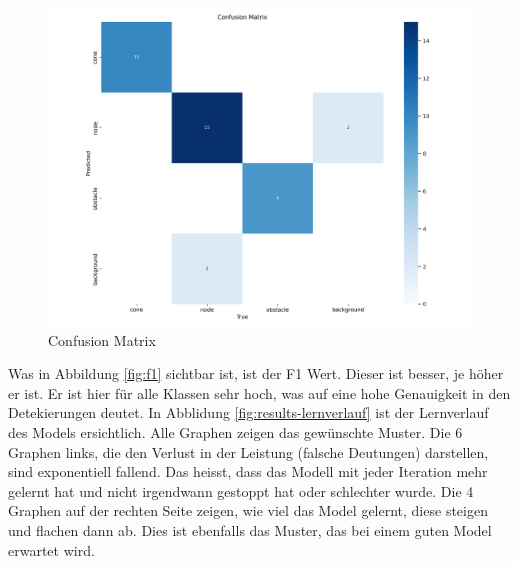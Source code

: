 \begin{figure}[H]
    \includegraphics[width=\textwidth]{assets/IT/yolo/confusion_matrix.png}
    \caption{Confusion Matrix}
    \label{fig:conf-matrix}
\end{figure}

Was in Abbildung \ref{fig:f1}  sichtbar ist, ist der F1 Wert. Dieser ist besser, je höher er ist. Er ist hier für alle Klassen sehr hoch, was auf eine hohe Genauigkeit in den Detekierungen deutet. In Abblidung \ref{fig:results-lernverlauf} ist der Lernverlauf des Models ersichtlich. Alle Graphen zeigen das gewünschte Muster. Die 6 Graphen links, die den Verlust in der Leistung (falsche Deutungen) darstellen, sind exponentiell fallend. Das heisst, dass das Modell mit jeder Iteration mehr gelernt hat und nicht irgendwann gestoppt hat oder schlechter wurde. Die 4 Graphen auf der rechten Seite zeigen, wie viel das Model gelernt, diese steigen und flachen dann ab. Dies ist ebenfalls das Muster, das bei einem guten Model erwartet wird.\cite{model-performance}


